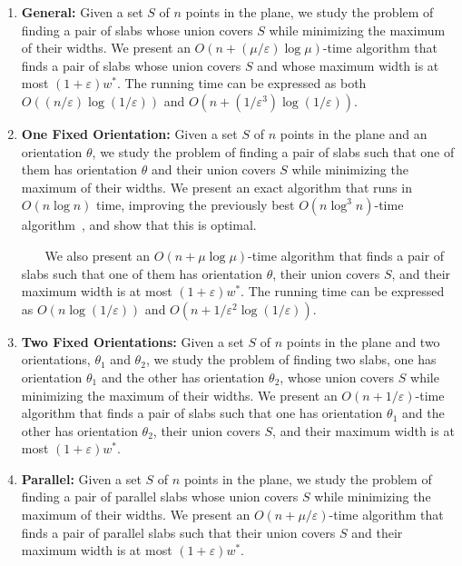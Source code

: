 \documentclass[10pt,a4paper]{article}
\theoremstyle{star}
\theoremstyle{claimstar}
\newcommand{\eps}{\ensuremath{\varepsilon}}
\begin{document}
\begin{enumerate}
    \item \textbf{\textsf{General:}}
    Given a set $S$ of $n$ points in the plane, we study the problem of finding a pair of slabs whose union covers $S$ while minimizing the maximum of their widths. 
    We present an $O(n + (\mu/\eps)\log \mu )$-time algorithm that finds a pair of slabs whose union covers $S$ and whose maximum width is at most $(1+\eps)w^*$. The running time can be expressed as both $O((n/\eps)\log(1/\eps))$ and $O(n + (1/\eps^3)\log(1/\eps))$. 

    \item \textbf{\textsf{One Fixed Orientation:}} 
    Given a set $S$ of $n$ points in the plane and an orientation $\theta$, we study the problem of finding a pair of slabs such that one of them has orientation $\theta$ and their union covers $S$ while minimizing the maximum of their widths. 
    We present an exact algorithm that runs in $O(n\log n)$ time, improving the previously best $O(n\log^3 n)$-time algorithm~\cite{ahn2024constrained}, and show that this is optimal. 
    
    ~$\quad$ We also present an $O(n+ \mu \log \mu)$-time algorithm that finds a pair of slabs such that one of them has orientation $\theta$, their union covers $S$, and their maximum width is at most $(1+\eps)w^*$.
    The running time can be expressed as $O(n\log (1/\eps))$ and $O(n + 1/\eps^2 \log (1/\eps))$.

    \item \textbf{\textsf{Two Fixed Orientations:}}
    Given a set $S$ of $n$ points in the plane and two orientations, $\theta_1$ and $\theta_2$, we study the problem of finding two slabs, one has orientation $\theta_1$ and the other has orientation $\theta_2$, whose union covers $S$ while minimizing the maximum of their widths. 
    We present an $O(n+ 1/\eps)$-time algorithm that finds a pair of slabs such that 
    one has orientation $\theta_1$ and the other has orientation $\theta_2$, their union covers $S$, and their maximum width is at most $(1+\eps)w^*$.

    \item \textbf{\textsf{Parallel:}}
    Given a set $S$ of $n$ points in the plane, we study the problem of finding a pair of parallel slabs whose union covers $S$ while minimizing the maximum of their widths. 
    We present an $O(n + \mu / \eps)$-time algorithm that finds a pair of parallel slabs such that their union covers $S$ and their maximum width is at most $(1+\eps)w^*$. 
\end{enumerate}
\end{document}
